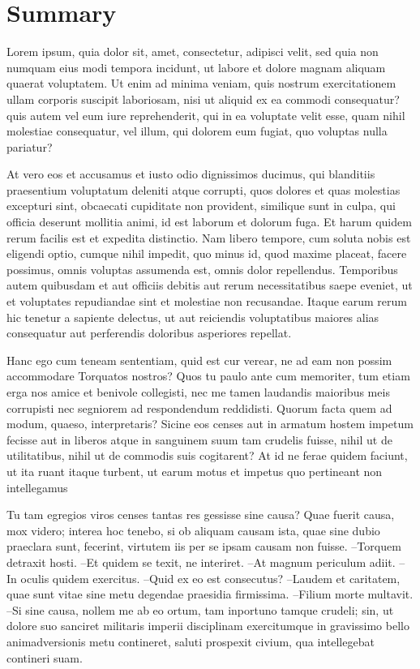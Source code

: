 \chapter*{Summary}

Lorem ipsum, quia dolor sit, amet, consectetur, adipisci velit, sed quia non numquam eius modi tempora incidunt, ut labore et dolore magnam aliquam quaerat voluptatem. Ut enim ad minima veniam, quis nostrum exercitationem ullam corporis suscipit laboriosam, nisi ut aliquid ex ea commodi consequatur? quis autem vel eum iure reprehenderit, qui in ea voluptate velit esse, quam nihil molestiae consequatur, vel illum, qui dolorem eum fugiat, quo voluptas nulla pariatur?

At vero eos et accusamus et iusto odio dignissimos ducimus, qui blanditiis praesentium voluptatum deleniti atque corrupti, quos dolores et quas molestias excepturi sint, obcaecati cupiditate non provident, similique sunt in culpa, qui officia deserunt mollitia animi, id est laborum et dolorum fuga. Et harum quidem rerum facilis est et expedita distinctio. Nam libero tempore, cum soluta nobis est eligendi optio, cumque nihil impedit, quo minus id, quod maxime placeat, facere possimus, omnis voluptas assumenda est, omnis dolor repellendus.
Temporibus autem quibusdam et aut officiis debitis aut rerum necessitatibus saepe eveniet, ut et voluptates repudiandae sint et molestiae non recusandae. Itaque earum rerum hic tenetur a sapiente delectus, ut aut reiciendis voluptatibus maiores alias consequatur aut perferendis doloribus asperiores repellat.

Hanc ego cum teneam sententiam, quid est cur verear, ne ad eam non possim accommodare Torquatos nostros? Quos tu paulo ante cum memoriter, tum etiam erga nos amice et benivole collegisti, nec me tamen laudandis maioribus meis corrupisti nec segniorem ad respondendum reddidisti. Quorum facta quem ad modum, quaeso, interpretaris? Sicine eos censes aut in armatum hostem impetum fecisse aut in liberos atque in sanguinem suum tam crudelis fuisse, nihil ut de utilitatibus, nihil ut de commodis suis cogitarent? At id ne ferae quidem faciunt, ut ita ruant itaque turbent, ut earum motus et impetus quo pertineant non intellegamus

Tu tam egregios viros censes tantas res gessisse sine causa? Quae fuerit causa, mox videro; interea hoc tenebo, si ob aliquam causam ista, quae sine dubio praeclara sunt, fecerint, virtutem iis per se ipsam causam non fuisse.
--Torquem detraxit hosti.
--Et quidem se texit, ne interiret.
--At magnum periculum adiit.
--In oculis quidem exercitus.
--Quid ex eo est consecutus?
--Laudem et caritatem, quae sunt vitae sine metu degendae praesidia firmissima.
--Filium morte multavit.
--Si sine causa, nollem me ab eo ortum, tam inportuno tamque crudeli; sin, ut dolore suo sanciret militaris imperii disciplinam exercitumque in gravissimo bello animadversionis metu contineret, saluti prospexit civium, qua intellegebat contineri suam.

